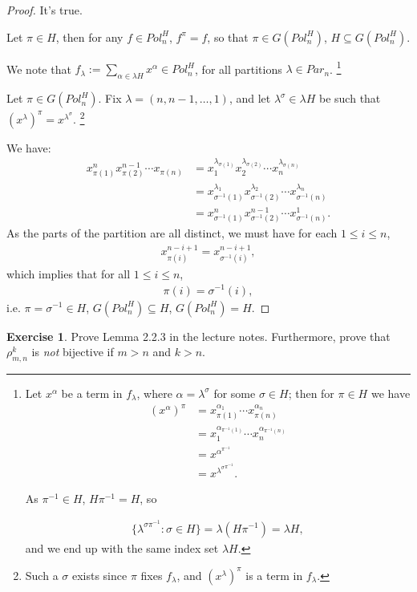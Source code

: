 \documentclass[12pt]{extarticle}
\newcommand{\set}[1]{\{#1\}}
\newcommand{\<}{\langle}
\renewcommand{\>}{\rangle}
\theoremstyle{definition}
\newtheorem{exercise}{Exercise}
\begin{document}
\begin{proof}
  It's true.

  Let $\pi \in H$, then for any $f \in Pol_n^H$, $f^{\pi} = f$, so that $\pi \in G(Pol_n^H)$, $H \subseteq G(Pol_n^H)$.

  We note that $f_{\lambda} := \sum\limits_{\alpha \in \lambda H} x^{\alpha} \in Pol_n^H$, for all partitions $\lambda \in Par_n$.
  \footnote{Let $x^\alpha$ be a term in $f_{\lambda}$, where $\alpha = \lambda^{\sigma}$ for some $\sigma \in H$; then for $\pi \in H$ we have
  \begin{align*}
    (x^\alpha)^{\pi}
    &= x_{\pi(1)}^{\alpha_1} \cdots x_{\pi(n)}^{\alpha_n} \\
    &= x_{1}^{\alpha_{\pi^{-1}(1)}} \cdots x_{n}^{\alpha_{\pi^{-1}(n)}} \\
    &= x^{\alpha^{\pi^{-1}}} \\ 
    &= x^{{\lambda^{\sigma}}^{\pi^{-1}}}.
  \end{align*}

  As $\pi^{-1} \in H$, $H\pi^{-1} = H$, so 
  
  \begin{align*}
    \set{\lambda^{\sigma \pi^{-1}}: \sigma \in H} = \lambda(H \pi^{-1}) = \lambda H,
  \end{align*}
  and we end up with the same index set $\lambda H$.

  }

  Let $\pi \in G(Pol_n^H)$. Fix $\lambda = (n, n-1, \dots, 1)$, and let $\lambda^{\sigma} \in \lambda H$ be such that ${(x^{\lambda})}^{\pi} = x^{\lambda^{\sigma}}$. \footnote{Such a $\sigma$ exists since $\pi$ fixes $f_{\lambda}$, and ${(x^\lambda)}^{\pi}$ is a term in $f_{\lambda}$.}
  
  We have:
  \begin{align*}
    x_{\pi(1)}^nx_{\pi(2)}^{n-1} \cdots x_{\pi(n)}
    &= x_1^{\lambda_{\sigma(1)}} x_2^{\lambda_{\sigma(2)}} \cdots x_n^{\lambda_{\sigma(n)}} \\
    &= x_{\sigma^{-1}(1)}^{\lambda_1} x_{\sigma^{-1}(2)}^{\lambda_2} \cdots x_{\sigma^{-1}(n)}^{\lambda_n} \\
    &= x_{\sigma^{-1}(1)}^{n} x_{\sigma^{-1}(2)}^{n-1} \cdots x_{\sigma^{-1}(n)}^{1}.
  \end{align*}
  As the parts of the partition are all distinct, we must have for each $1 \leq i \leq n$,
  \begin{align*}
    x_{\pi(i)}^{n-i+1} = x_{\sigma^{-1}(i)}^{n-i+1},
  \end{align*}
  which implies that for all $1 \leq i \leq n$,
  \begin{align*}
    \pi(i) = \sigma^{-1}(i),
  \end{align*}
  i.e. $\pi = \sigma^{-1} \in H$, $G(Pol_n^H) \subseteq H$, $G(Pol_n^H) = H$.

\end{proof}

\begin{exercise}
  Prove Lemma 2.2.3 in the lecture notes. Furthermore, prove that $\rho_{m,n}^k$ is \emph{not} bijective if $m>n$ and $k>n$.
\end{exercise}
\end{document}
